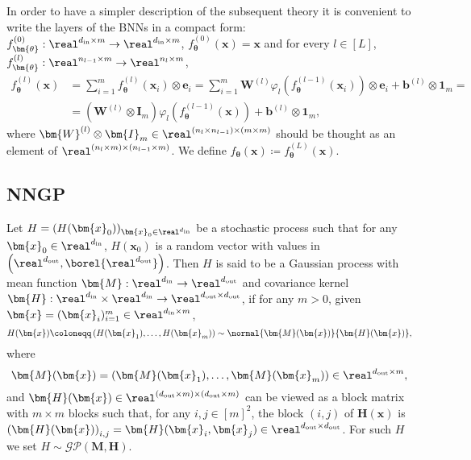 \begin{remark} \label{rem:nncompact}
    In order to have a simpler description of the subsequent theory it is convenient to write the layers of the BNNs in a compact form: $f^{(0)}_{\bm{\theta}}: \real^{d_{\mathrm{in}} \times m} \to \real^{d_{\mathrm{in}} \times m}$, $f^{(0)}_{\bm{\theta}}(\bm{x}) = \bm{x}$ and for every $l \in [L]$, $f^{(l)}_{\bm{\theta}}: \real^{n_{l - 1} \times m} \to \real^{n_l \times m}$,
    \begin{align*}
        f^{(l)}_{\bm{\theta}}(\bm{x}) & = \sum_{i = 1}^m f^{(l)}_{\bm{\theta}}(\bm{x}_i) \otimes \bm{e}_i = \sum_{i = 1}^m \bm{W}^{(l)} \varphi_l\left(f^{(l - 1)}_{\bm{\theta}}(\bm{x}_i)\right) \otimes \bm{e}_i + \bm{b}^{(l)} \otimes \bm{1}_{m} = \\
        & = \left(\bm{W}^{(l)} \otimes \bm{I}_{m}\right) \varphi_l\left(f^{(l - 1)}_{\bm{\theta}}(\bm{x})\right) + \bm{b}^{(l)} \otimes \bm{1}_{m},
    \end{align*}
    where $\bm{W}^{(l)} \otimes \bm{I}_{m} \in \real^{(n_l \times n_{l - 1}) \times (m \times m)}$ should be thought as an element of $\real^{(n_l \times m) \times (n_{l - 1} \times m)}$. We define $f_{\bm{\theta}}(\bm{x}) \coloneqq f^{(L)}_{\bm{\theta}}(\bm{x})$.
\end{remark}

\subsection{NNGP} 

\begin{definition} \label{def:gp}
    Let $H = (H(\bm{x}_0))_{\bm{x}_0 \in \real^{d_{\mathrm{in}}}}$ be a stochastic process such that for any $\bm{x}_0 \in \real^{d_{\mathrm{in}}}$, $H(\bm{x}_0)$ is a random vector with values in $\left(\real^{d_{\mathrm{out}}}, \borel{\real^{d_{\mathrm{out}}}}\right)$. 
    Then $H$ is said to be a Gaussian process with mean function $\bm{M}: \real^{d_{\mathrm{in}}} \to \real^{d_{\mathrm{out}}}$ and covariance kernel $\bm{H}: \real^{d_{\mathrm{in}}} \times \real^{d_{\mathrm{in}}} \to \real^{d_{\mathrm{out}} \times d_{\mathrm{out}}}$, if for any $m > 0$, given $\bm{x} = (\bm{x}_i)_{i = 1}^m \in \real^{d_{\mathrm{in}} \times m}$,
    \begin{equation*}
        H(\bm{x}) \coloneqq \left(H(\bm{x}_1), \dots, H(\bm{x}_m)\right) \sim \normal{\bm{M}(\bm{x})}{\bm{H}(\bm{x})},
    \end{equation*}
    where
    \begin{equation*}
        \bm{M}(\bm{x}) = \left(\bm{M}(\bm{x}_1), \dots, \bm{M}(\bm{x}_m)\right) \in \real^{d_{\mathrm{out}} \times m},
    \end{equation*}
    and $\bm{H}(\bm{x}) \in \real^{(d_{\mathrm{out}} \times m) \times (d_{\mathrm{out}} \times m)}$ can be viewed as a block matrix with $m \times m$ blocks such that, for any $i, j \in [m]^2$, the block $(i, j)$ of $\bm{H}(\bm{x})$ is $\left(\bm{H}(\bm{x})\right)_{i, j} = \bm{H}(\bm{x}_i, \bm{x}_j) \in \real^{d_{\mathrm{out}} \times d_{\mathrm{out}}}$. 
    For such $H$ we set $H \sim \mathcal{GP}\left(\bm{M}, \bm{H}\right)$. 
\end{definition}

